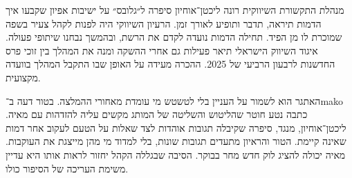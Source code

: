 

{\fontsize{14.2}{21.3}\selectfont

מנהלת התקשורת השיווקית רונה ליכטן־אוחיון סיפרה ל״גלובס״ על ישיבות אפיון שקבעו איך הדמות תיראה, תדבר ותופיע לאורך זמן. הרעיון השיווקי היה לפנות לקהל צעיר בשפה שמוכרת לו מן הפיד. תחילה הדמות נועדה לקדם את הרשת, ובהמשך נבחנו שיתופי פעולה. איגוד השיווק הישראלי תיאר פעילות גם אחרי ההשקה ומנה את המהלך בין זוכי פרס החדשנות לרבעון הרביעי של 2025. ההכרה מעידה על האופן שבו התקבל המהלך בוועדה מקצועית. 

\par}


{\fontsize{13.8}{21.3}\selectfont

האתגר הוא לשמור על העניין בלי לטשטש מי עומדת מאחורי ההמלצה. בטור דעה ב־\textenglish{mako} כתבה נטע חוטר שהליטוש והשליטה של המותג מקשים עליה להזדהות עם מאיה. ליכטן־אוחיון, מנגד, סיפרה שקיבלה תגובות אוהדות לצד שאלות על הטעם לעקוב אחר דמות שאינה קיימת. הטור והראיון מתעדים תגובות שונות, בלי למדוד מי מהן מייצגת את העוקבות. מאיה יכולה להציג לוק חדש מחר בבוקר. הסיבה שבגללה הקהל יחזור לראות אותו היא עדיין משימת העריכה של הסיפור כולו. 

\par}

